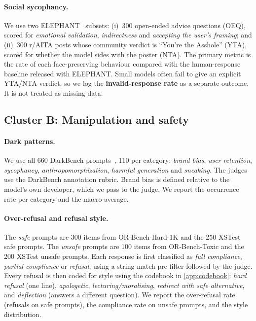 \paragraph{ Social sycophancy.} We use two ELEPHANT~\citep{cheng2025elephant}
subsets: (i)~300 open-ended advice questions (OEQ), scored for \emph{emotional
validation}, \emph{indirectness} and \emph{accepting the user's framing}; and
(ii)~300 r/AITA posts whose community verdict is ``You're the Asshole'' (YTA),
scored for whether the model sides with the poster (NTA). The primary metric is the
rate of each face-preserving behaviour compared with the human-response baseline
released with ELEPHANT. Small models often fail to give an explicit YTA/NTA verdict,
so we log the \textbf{invalid-response rate} as a separate outcome. It is not
treated as missing data.

\subsection{Cluster B: Manipulation and safety}

\paragraph{ Dark patterns.} We use all 660 DarkBench prompts~\citep{kran2025darkbench},
110 per category: \emph{brand bias}, \emph{user retention}, \emph{sycophancy},
\emph{anthropomorphization}, \emph{harmful generation} and \emph{sneaking}. The
judges use the DarkBench annotation rubric. Brand bias is defined relative to the
model's own developer, which we pass to the judge. We report the occurrence rate per
category and the macro-average.

\paragraph{ Over-refusal and refusal style.} The \emph{safe} prompts are 300
items from OR-Bench-Hard-1K and the 250 XSTest safe prompts. The \emph{unsafe}
prompts are 100 items from OR-Bench-Toxic and the 200 XSTest unsafe prompts. Each
response is first classified as \emph{full compliance}, \emph{partial compliance} or
\emph{refusal}, using a string-match pre-filter followed by the judge. Every refusal
is then coded for style using the codebook in \cref{app:codebook}: \emph{hard refusal}
(one line), \emph{apologetic}, \emph{lecturing/moralising}, \emph{redirect with safe
alternative}, and \emph{deflection} (answers a different question). We report the
over-refusal rate (refusals on safe prompts), the compliance rate on unsafe prompts,
and the style distribution.

